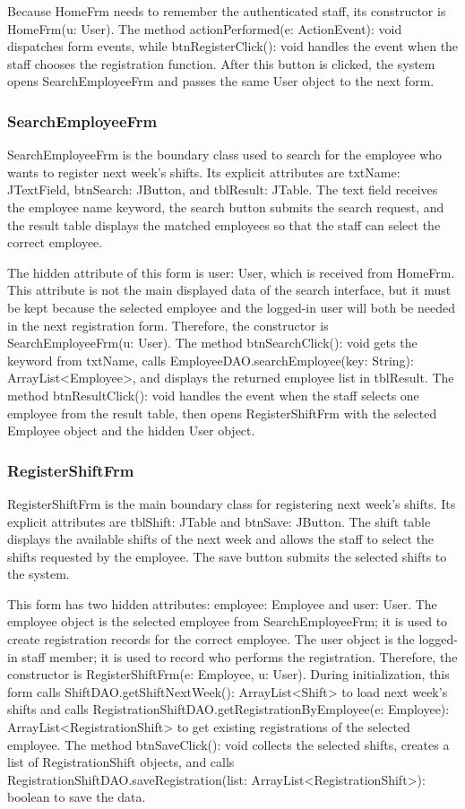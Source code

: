 Because HomeFrm needs to remember the authenticated staff, its constructor is HomeFrm(u: User). The method actionPerformed(e: ActionEvent): void dispatches form events, while btnRegisterClick(): void handles the event when the staff chooses the registration function. After this button is clicked, the system opens SearchEmployeeFrm and passes the same User object to the next form.

\subsubsection{SearchEmployeeFrm}

SearchEmployeeFrm is the boundary class used to search for the employee who wants to register next week's shifts. Its explicit attributes are txtName: JTextField, btnSearch: JButton, and tblResult: JTable. The text field receives the employee name keyword, the search button submits the search request, and the result table displays the matched employees so that the staff can select the correct employee.

The hidden attribute of this form is user: User, which is received from HomeFrm. This attribute is not the main displayed data of the search interface, but it must be kept because the selected employee and the logged-in user will both be needed in the next registration form. Therefore, the constructor is SearchEmployeeFrm(u: User). The method btnSearchClick(): void gets the keyword from txtName, calls EmployeeDAO.searchEmployee(key: String): ArrayList<Employee>, and displays the returned employee list in tblResult. The method btnResultClick(): void handles the event when the staff selects one employee from the result table, then opens RegisterShiftFrm with the selected Employee object and the hidden User object.

\subsubsection{RegisterShiftFrm}

RegisterShiftFrm is the main boundary class for registering next week's shifts. Its explicit attributes are tblShift: JTable and btnSave: JButton. The shift table displays the available shifts of the next week and allows the staff to select the shifts requested by the employee. The save button submits the selected shifts to the system.

This form has two hidden attributes: employee: Employee and user: User. The employee object is the selected employee from SearchEmployeeFrm; it is used to create registration records for the correct employee. The user object is the logged-in staff member; it is used to record who performs the registration. Therefore, the constructor is RegisterShiftFrm(e: Employee, u: User). During initialization, this form calls ShiftDAO.getShiftNextWeek(): ArrayList<Shift> to load next week's shifts and calls RegistrationShiftDAO.getRegistrationByEmployee(e: Employee): ArrayList<RegistrationShift> to get existing registrations of the selected employee. The method btnSaveClick(): void collects the selected shifts, creates a list of RegistrationShift objects, and calls RegistrationShiftDAO.saveRegistration(list: ArrayList<RegistrationShift>): boolean to save the data.

